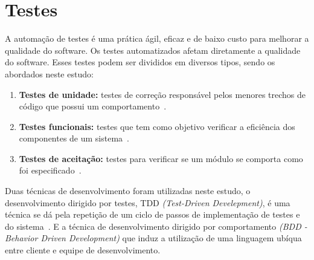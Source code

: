 \section{Testes}
\label{sec:testes}

A automação de testes é uma prática ágil, eficaz e de baixo custo para melhorar
a qualidade do software.
%
Os testes automatizados afetam diretamente a qualidade do software\cite{bernardo2011}.
Esses testes podem ser divididos em diversos tipos, sendo os abordados neste estudo:

\begin{enumerate}

\item \textbf{Testes de unidade:} testes de correção responsável pelos
menores trechos de código que possui um comportamento~\cite{bernardo2011}.

\item \textbf{Testes funcionais:} testes que tem como objetivo verificar a eficiência
dos componentes de um sistema~\cite{molinari2003}.

\item \textbf{Testes de aceitação:} testes para verificar se um módulo se comporta como foi especificado~\cite{martin2005}.

\end{enumerate}
Duas técnicas de desenvolvimento foram utilizadas neste estudo, o desenvolvimento dirigido por testes, TDD \textit{(Test-Driven Develepment)}, é uma técnica se dá pela repetição de um ciclo de passos de implementação de testes e do sistema~\cite{koskela2007}.
%
E a técnica de desenvolvimento dirigido por comportamento \textit{(BDD - Behavior Driven Development)} que induz a utilização de uma linguagem ubíqua entre cliente e equipe de desenvolvimento. 
%
	


